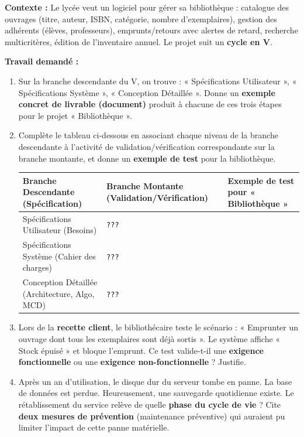 \documentclass[11pt]{article}
\begin{document}
\begin{exercice}
\textbf{Contexte :} Le lycée veut un logiciel pour gérer sa bibliothèque : catalogue des ouvrages (titre, auteur, ISBN, catégorie, nombre d'exemplaires), gestion des adhérents (élèves, professeurs), emprunts/retours avec alertes de retard, recherche multicritères, édition de l'inventaire annuel. Le projet suit un \textbf{cycle en V}.

\textbf{Travail demandé :}
\begin{enumerate}
    \item Sur la branche descendante du V, on trouve : « Spécifications Utilisateur », « Spécifications Système », « Conception Détaillée ». Donne un \textbf{exemple concret de livrable (document)} produit à chacune de ces trois étapes pour le projet « Bibliothèque ».
    \item Complète le tableau ci-dessous en associant chaque niveau de la branche descendante à l'activité de validation/vérification correspondante sur la branche montante, et donne un \textbf{exemple de test} pour la bibliothèque.

\begin{center}
\begin{tabularx}{\linewidth}{|l|l|X|}
\hline
\textbf{Branche Descendante (Spécification)} & \textbf{Branche Montante (Validation/Vérification)} & \textbf{Exemple de test pour « Bibliothèque »} \\
\hline
Spécifications Utilisateur (Besoins) & \texttt{???} & \\
\hline
Spécifications Système (Cahier des charges) & \texttt{???} & \\
\hline
Conception Détaillée (Architecture, Algo, MCD) & \texttt{???} & \\
\hline
\end{tabularx}
\end{center}

    \item Lors de la \textbf{recette client}, le bibliothécaire teste le scénario : « Emprunter un ouvrage dont tous les exemplaires sont déjà sortis ». Le système affiche « Stock épuisé » et bloque l'emprunt. Ce test valide-t-il une \textbf{exigence fonctionnelle} ou une \textbf{exigence non-fonctionnelle} ? Justifie.
    \item Après un an d'utilisation, le disque dur du serveur tombe en panne. La base de données est perdue. Heureusement, une sauvegarde quotidienne existe. Le rétablissement du service relève de quelle \textbf{phase du cycle de vie} ? Cite \textbf{deux mesures de prévention} (maintenance préventive) qui auraient pu limiter l'impact de cette panne matérielle.
\end{enumerate}
\end{exercice}
\end{document}
